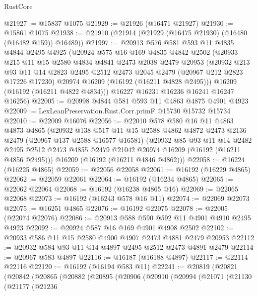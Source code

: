 \begin{lexlean}{RustCore}
\begin{coremodule}
@21927 := @15837 @1075
@21929 := @21926 (@16471 @21927)
@21930 := @15861 @1075
@21938 := @21910 (@21914 (@21929 (@16475 @21930) (@16480 (@16482 @159)) @16489))
@21997 := @20913
    @576
    @581
    @593
    @11
    @4835
    @4844
    @2495
    @4925
    (@20924
      @575
      @16
      @169
      @4835
      @4842
      @2502
      (@20933
        @215
        @11
        @15
        @2580
        @4834
        @4841
        @2473
        @2038
        @2479
        @20953
        (@20932
          @213
          @93
          @11
          @14
          @2823
          @2495
          @2512
          @2473
          @2045
          @2479
          (@20967 @212 @2823 @17226 @17230)
          @20974
          @16209
          (@16192 (@16211 @4828 @2495)))
        @16209
        (@16192 (@16211 @4822 @4834)))
      @16227
      @16231
      @16236
      @16241
      @16247
      @16256)
@22005 := @20998 @4844 @581 @593 @11 @4863 @4875 @4901 @4923
@22009 := LexLeanPreservation.Rust.Corr.primF @15730 @15732 @15734
@22010 := @22009 @16076
@22056 := @22010
    @578
    @580
    @16
    @11
    @4863
    @4873
    @4865
    (@20932
      @138
      @517
      @11
      @15
      @2588
      @4862
      @4872
      @2473
      @2136
      @2479
      (@20967 @137 @2588 @16577 @16581)
      (@20932
        @85
        @93
        @11
        @14
        @2482
        @2495
        @2512
        @2473
        @4855
        @2479
        @21042
        @20974
        @16209
        (@16192 (@16211 @4856 @2495)))
      @16209
      (@16192 (@16211 @4846 @4862)))
@22058 := @16224 (@16225 @4865)
@22059 := @22056 @22058
@22061 := @16192 (@16229 @4865)
@22062 := @22059 @22061
@22064 := @16192 (@16234 @4865)
@22065 := @22062 @22064
@22068 := @16192 (@16238 @4865 @16)
@22069 := @22065 @22068
@22073 := @16192 (@16243 @578 @16 @11)
@22074 := @22069 @22073
@22075 := @16251 @4865
@22076 := @16192 @22075
@22078 := @22005 (@22074 @22076)
@22086 := @20913 @588 @590 @592 @11 @4901 @4910 @2495 @4923
@22092 := @20924 @587 @16 @169 @4901 @4908 @2502
@22102 := @20933 @586 @11 @15 @2580 @4900 @4907 @2473 @4881 @2479 @20953
@22112 := @20932 @584 @93 @11 @14 @4897 @2495 @2512 @2473 @4891 @2479
@22114 := @20967 @583 @4897
@22116 := @16187 (@16188 @4897)
@22117 := @22114 @22116
@22120 := @16192 (@16194 @583 @11)
@22241 := @20819
    (@20821
      (@20842
        (@20865
          (@20882
            (@20895
              (@20906
                (@20910
                  (@20994
                    (@21071
                      (@21130
                        (@21177
                          (@21236

\end{coremodule}
\end{lexlean}
